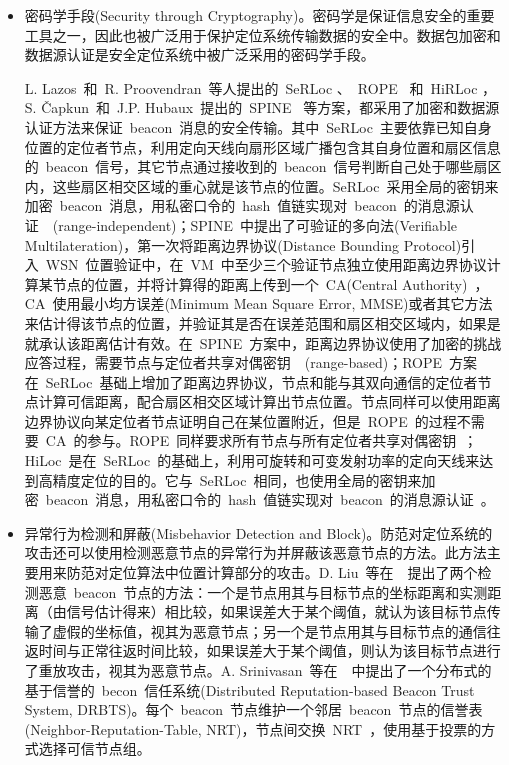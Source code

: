 \documentclass[a4paper,10pt]{article}
\begin{document}
\begin{itemize}

\item 密码学手段(Security through Cryptography)。密码学是保证信息安全的重要工具之一，因此也被广泛用于保护定位系统传输数据的安全中。数据包加密和数据源认证是安全定位系统中被广泛采用的密码学手段。

L. Lazos~和~R. Proovendran~等人提出的~SeRLoc \cite{Lazos2005}、~ROPE \cite{Lazos2006}~和~HiRLoc \cite{Lazos2005a}，S. \v{C}apkun~和~J.P. Hubaux~提出的~SPINE \cite{Capkun2005, Capkun2006}~等方案，都采用了加密和数据源认证方法来保证~beacon~消息的安全传输。其中~SeRLoc~主要依靠已知自身位置的定位者节点，利用定向天线向扇形区域广播包含其自身位置和扇区信息的~beacon~信号，其它节点通过接收到的~beacon~信号判断自己处于哪些扇区内，这些扇区相交区域的重心就是该节点的位置。SeRLoc~采用全局的密钥来加密~beacon~消息，用私密口令的~hash~值链实现对~beacon~的消息源认证~\cite{Lazos2005}~(range-independent)；SPINE~中提出了可验证的多向法(Verifiable Multilateration)，第一次将距离边界协议(Distance Bounding Protocol)引入~WSN~位置验证中，在~VM~中至少三个验证节点独立使用距离边界协议计算某节点的位置，并将计算得的距离上传到一个~CA(Central Authority)~，CA~使用最小均方误差(Minimum Mean Square Error, MMSE)或者其它方法来估计得该节点的位置，并验证其是否在误差范围和扇区相交区域内，如果是就承认该距离估计有效。在~SPINE~方案中，距离边界协议使用了加密的挑战应答过程，需要节点与定位者共享对偶密钥~\cite{Capkun2005}~(range-based)；ROPE~方案在~SeRLoc~基础上增加了距离边界协议，节点和能与其双向通信的定位者节点计算可信距离，配合扇区相交区域计算出节点位置。节点同样可以使用距离边界协议向某定位者节点证明自己在某位置附近，但是~ROPE~的过程不需要~CA~的参与。ROPE~同样要求所有节点与所有定位者共享对偶密钥~\cite{Lazos2006}；HiLoc~是在~SeRLoc~的基础上，利用可旋转和可变发射功率的定向天线来达到高精度定位的目的。它与~SeRLoc~相同，也使用全局的密钥来加密~beacon~消息，用私密口令的~hash~值链实现对~beacon~的消息源认证~\cite{Lazos2005a}。

\item 异常行为检测和屏蔽(Misbehavior Detection and Block)。防范对定位系统的攻击还可以使用检测恶意节点的异常行为并屏蔽该恶意节点的方法。此方法主要用来防范对定位算法中位置计算部分的攻击。D. Liu~等在~\cite{Liu2005c}~提出了两个检测恶意~beacon~节点的方法：一个是节点用其与目标节点的坐标距离和实测距离（由信号估计得来）相比较，如果误差大于某个阈值，就认为该目标节点传输了虚假的坐标值，视其为恶意节点；另一个是节点用其与目标节点的通信往返时间与正常往返时间比较，如果误差大于某个阈值，则认为该目标节点进行了重放攻击，视其为恶意节点。A. Srinivasan~等在~\cite{Srinivasan2006}~中提出了一个分布式的基于信誉的~becon~信任系统(Distributed Reputation-based Beacon Trust System, DRBTS)。每个~beacon~节点维护一个邻居~beacon~节点的信誉表(Neighbor-Reputation-Table, NRT)，节点间交换~NRT~，使用基于投票的方式选择可信节点组。


\end{itemize}
\end{document}
